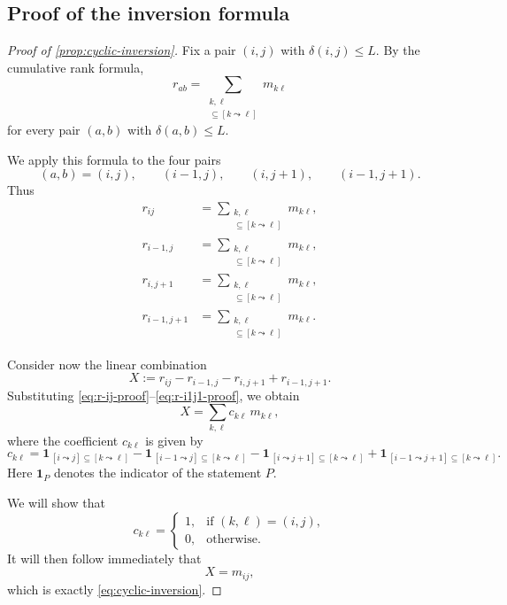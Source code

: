 \documentclass{article}
\theoremstyle{definition}
\begin{document}
\subsection*{Proof of the inversion formula}
\begin{proof}[Proof of \ref{prop:cyclic-inversion}]\label{app:proof_cyclic_inversion}
Fix a pair $(i,j)$ with $\delta(i,j)\le L$.
By the cumulative rank formula,
\begin{equation}\label{eq:rank-cumulative-proof}
r_{ab}
=
\sum_{\substack{k,\ell\\ [a\leadsto b]\subseteq [k\leadsto \ell]}}
m_{k\ell}
\end{equation}
for every pair $(a,b)$ with $\delta(a,b)\le L$.

We apply this formula to the four pairs
\[
(a,b)=(i,j),\qquad (i-1,j),\qquad (i,j+1),\qquad (i-1,j+1).
\]
Thus
\begin{align}
r_{ij}
&=
\sum_{\substack{k,\ell\\ [i\leadsto j]\subseteq [k\leadsto \ell]}}
m_{k\ell},
\label{eq:r-ij-proof}
\\
r_{i-1,j}
&=
\sum_{\substack{k,\ell\\ [i-1\leadsto j]\subseteq [k\leadsto \ell]}}
m_{k\ell},
\label{eq:r-i1j-proof}
\\
r_{i,j+1}
&=
\sum_{\substack{k,\ell\\ [i\leadsto j+1]\subseteq [k\leadsto \ell]}}
m_{k\ell},
\label{eq:r-ij1-proof}
\\
r_{i-1,j+1}
&=
\sum_{\substack{k,\ell\\ [i-1\leadsto j+1]\subseteq [k\leadsto \ell]}}
m_{k\ell}.
\label{eq:r-i1j1-proof}
\end{align}

Consider now the linear combination
\[
X
:=
r_{ij}-r_{i-1,j}-r_{i,j+1}+r_{i-1,j+1}.
\]
Substituting \eqref{eq:r-ij-proof}--\eqref{eq:r-i1j1-proof}, we obtain
\[
X
=
\sum_{k,\ell} c_{k\ell}\, m_{k\ell},
\]
where the coefficient $c_{k\ell}$ is given by
\[
c_{k\ell}
=
\mathbf 1_{\,[i\leadsto j]\subseteq [k\leadsto \ell]}
-
\mathbf 1_{\,[i-1\leadsto j]\subseteq [k\leadsto \ell]}
-
\mathbf 1_{\,[i\leadsto j+1]\subseteq [k\leadsto \ell]}
+
\mathbf 1_{\,[i-1\leadsto j+1]\subseteq [k\leadsto \ell]}.
\]
Here $\mathbf 1_P$ denotes the indicator of the statement $P$.

We will show that
\[
c_{k\ell}=
\begin{cases}
1,&\text{if }(k,\ell)=(i,j),\\
0,&\text{otherwise.}
\end{cases}
\]
It will then follow immediately that
\[
X=m_{ij},
\]
which is exactly \eqref{eq:cyclic-inversion}.


\end{proof}
\end{document}
